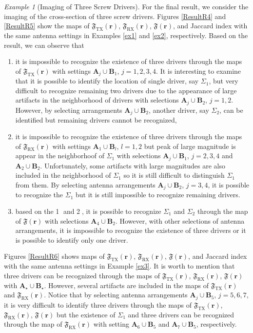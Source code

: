\documentclass[3p,10pt]{elsarticle}
\newcommand{\mr}{\mathbf{r}}
\DeclareMathOperator*{\tx}{TX}
\DeclareMathOperator*{\rx}{RX}
\theoremstyle{plain}
\theoremstyle{remark}
\newtheorem{example}{Example}[section]
\begin{document}
\begin{example}[Imaging of Three Screw Drivers]\label{exR2}
For the final result, we consider the imaging of the cross-section of three screw drivers. Figures \ref{ResultR4} and \ref{ResultR5} show the maps of $\mathfrak{F}_{\tx}(\mr)$, $\mathfrak{F}_{\rx}(\mr)$, $\mathfrak{F}(\mr)$, and Jaccard index with the same antenna settings in Examples \ref{ex1} and \ref{ex2}, respectively. Based on the result, we can observe that
\begin{enumerate}
\item[\textcircled{1}] it is impossible to recognize the existence of three drivers through the maps of $\mathfrak{F}_{\tx}(\mr)$ with settings $\mathbf{A}_j\cup\mathbf{B}_1$, $j=1,2,3,4$. It is interesting to examine that it is possible to identify the location of single driver, say $\Sigma_1$, but very difficult to recognize remaining two drivers due to the appearance of large artifacts in the neighborhood of drivers with selections $\mathbf{A}_j\cup\mathbf{B}_2$, $j=1,2$. However, by selecting arrangements $\mathbf{A}_j\cup\mathbf{B}_2$, another driver, say $\Sigma_2$, can be identified but remaining drivers cannot be recognized,
\item[\textcircled{2}] it is impossible to recognize the existence of three drivers through the maps of $\mathfrak{F}_{\rx}(\mr)$ with settings $\mathbf{A}_1\cup\mathbf{B}_l$, $l=1,2$ but peak of large magnitude is appear in the neighborhoof of $\Sigma_1$ with selections $\mathbf{A}_j\cup\mathbf{B}_1$, $j=2,3,4$ and $\mathbf{A}_2\cup\mathbf{B}_2$. Unfortunately, some artifacts with large magnitudes are also included in the neighborhood of $\Sigma_1$ so it is still difficult to distinguish $\Sigma_1$ from them. By selecting antenna arrangements $\mathbf{A}_j\cup\mathbf{B}_2$, $j=3,4$, it is possible to recognize the $\Sigma_1$ but it is still impossible to recognize remaining drivers.
\item[\textcircled{3}] based on the \textcircled{1} and \textcircled{2}, it is possible to recognize $\Sigma_1$ and $\Sigma_2$ through the map of $\mathfrak{F}(\mr)$ with selections $\mathbf{A}_4\cup\mathbf{B}_2$. However, with other selections of antenna arrangements, it is impossible to recognize the existence of three drivers or it is possible to identify only one driver.
\end{enumerate}
Figures \ref{ResultR6} shows maps of $\mathfrak{F}_{\tx}(\mr)$, $\mathfrak{F}_{\rx}(\mr)$, $\mathfrak{F}(\mr)$, and Jaccard index with the same antenna settings in Example \ref{ex3}. It is worth to mention that three drivers can be recognized through the maps of $\mathfrak{F}_{\tx}(\mr)$, $\mathfrak{F}_{\rx}(\mr)$, $\mathfrak{F}(\mr)$ with $\mathbf{A}_\star\cup\mathbf{B}_\star$. However, several artifacts are included in the maps of $\mathfrak{F}_{\tx}(\mr)$ and $\mathfrak{F}_{\rx}(\mr)$. Notice that by selecting antenna arrangements $\mathbf{A}_j\cup\mathbf{B}_5$, $j=5,6,7$, it is very difficult to identify three drivers through the maps of $\mathfrak{F}_{\tx}(\mr)$, $\mathfrak{F}_{\rx}(\mr)$, $\mathfrak{F}(\mr)$ but the existence of $\Sigma_1$ and three drivers can be recognized through the map of $\mathfrak{F}_{\rx}(\mr)$ with setting $\mathbf{A}_6\cup\mathbf{B}_5$ and $\mathbf{A}_7\cup\mathbf{B}_5$, respectively.

\end{example}
\end{document}
